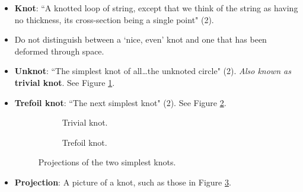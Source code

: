 \documentclass[titlepage]{article}
\numberwithin{figure}{section}
\numberwithin{table}{section}
\numberwithin{equation}{section}
\newcommand{\dq}[2]{``#1" (#2).}
\begin{document}
\begin{itemize}
    \item \textbf{Knot}: \dq{A knotted loop of string, except that we think of the string as having no thickness, its cross-section being a single point}{2}
    \item Do not distinguish between a `nice, even' knot and one that has been deformed through space.
    \item \textbf{Unknot}: \dq{The simplest knot of all\dots the unknoted circle}{2} \emph{Also known as} \textbf{trivial knot}. See Figure \ref{fig:circletrefoila}.
    \item \textbf{Trefoil knot}: \dq{The next simplest knot}{2} See Figure \ref{fig:circletrefoilb}.
    \begin{figure}[h!]
        \centering
        \begin{subfigure}{0.2\linewidth}
            \centering
            \caption{Trivial knot.}
            \label{fig:circletrefoila}
        \end{subfigure}
        \begin{subfigure}{0.2\linewidth}
            \centering
            \caption{Trefoil knot.}
            \label{fig:circletrefoilb}
        \end{subfigure}
        \caption{Projections of the two simplest knots.}
        \label{fig:circletrefoil}
    \end{figure}
    \item \textbf{Projection}: A picture of a knot, such as those in Figure \ref{fig:circletrefoil}.

\end{itemize}
\end{document}
